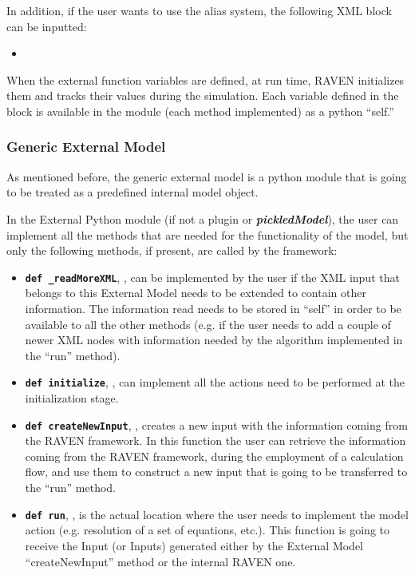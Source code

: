 In addition, if the user wants to use the alias system, the following XML block can be inputted:
\begin{itemize}
  \item {}
\end{itemize}


When the external function variables are defined, at run time, RAVEN initializes
them and tracks their values during the simulation.
%
Each variable defined in the  block is available in the
module (each method implemented) as a python ``self.''
%


\subsubsection{Generic External Model}
\label{subsubsec:generic_external_model}
As mentioned before, the generic external model is a python module that is going to be
treated as a predefined internal model object.

In the External Python module (if not a plugin or  \textbf{\textit{pickledModel}}), the user can implement all the methods that are
needed for the functionality of the model, but only the following methods, if
present, are called by the framework:
\begin{itemize}
  \item \texttt{\textbf{def \_readMoreXML}}, , can be
  implemented by the user if the XML input that belongs to this External Model
  needs to be extended to contain other information.
  The information read needs to be stored in ``self'' in order to be available
  to all the other methods (e.g. if the user needs to add a couple of newer XML
  nodes with information needed by the algorithm implemented in the ``run''
  method).
  \item \texttt{\textbf{def initialize}}, , can
  implement all the actions need to be performed at the initialization stage.
  \item \texttt{\textbf{def createNewInput}}, , creates
  a new input with the information coming from the RAVEN framework.
  In this function the user can retrieve the information coming from the RAVEN
  framework, during the employment of a calculation flow, and use them to
  construct a new input that is going to be transferred to the ``run'' method.
  \item \texttt{\textbf{def run}}, , is the actual
  location where the user needs to implement the model action (e.g. resolution
  of a set of equations, etc.).
  This function is going to receive the Input (or Inputs) generated either by
  the External Model ``createNewInput'' method or the internal RAVEN one.
\end{itemize}

